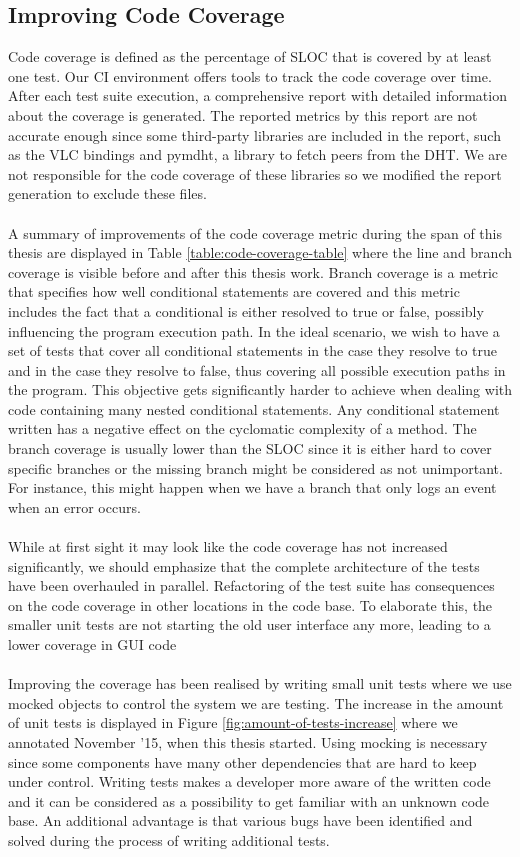 \subsection{Improving Code Coverage}
Code coverage is defined as the percentage of SLOC that is covered by at least one test. Our CI environment offers tools to track the code coverage over time. After each test suite execution, a comprehensive report with detailed information about the coverage is generated. The reported metrics by this report are not accurate enough since some third-party libraries are included in the report, such as the VLC bindings and pymdht, a library to fetch peers from the DHT. We are not responsible for the code coverage of these libraries so we modified the report generation to exclude these files.\\\\
A summary of improvements of the code coverage metric during the span of this thesis are displayed in Table \ref{table:code-coverage-table} where the line and branch coverage is visible before and after this thesis work. Branch coverage is a metric that specifies how well conditional statements are covered and this metric includes the fact that a conditional is either resolved to true or false, possibly influencing the program execution path. In the ideal scenario, we wish to have a set of tests that cover all conditional statements in the case they resolve to true and in the case they resolve to false, thus covering all possible execution paths in the program. This objective gets significantly harder to achieve when dealing with code containing many nested conditional statements. Any conditional statement written has a negative effect on the cyclomatic complexity of a method. The branch coverage is usually lower than the SLOC since it is either hard to cover specific branches or the missing branch might be considered as not unimportant. For instance, this might happen when we have a branch that only logs an event when an error occurs.\\\\
While at first sight it may look like the code coverage has not increased significantly, we should emphasize that the complete architecture of the tests have been overhauled in parallel. Refactoring of the test suite has consequences on the code coverage in other locations in the code base. To elaborate this, the smaller unit tests are not starting the old user interface any more, leading to a lower coverage in GUI code\\\\
Improving the coverage has been realised by writing small unit tests where we use mocked objects to control the system we are testing. The increase in the amount of unit tests is displayed in Figure \ref{fig:amount-of-tests-increase} where we annotated November '15, when this thesis started. Using mocking is necessary since some components have many other dependencies that are hard to keep under control. Writing tests makes a developer more aware of the written code and it can be considered as a possibility to get familiar with an unknown code base. An additional advantage is that various bugs have been identified and solved during the process of writing additional tests.\\

